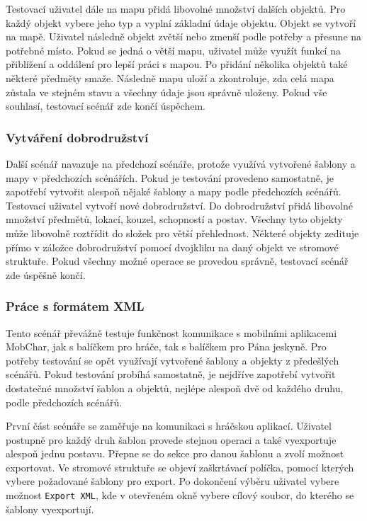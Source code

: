 \documentclass[thesis=B,czech]{resources/FITthesis}[2012/06/26]
\begin{document}
Testovací uživatel dále na mapu přidá libovolné množství dalších objektů. Pro každý objekt vybere jeho typ a vyplní základní údaje objektu. Objekt se vytvoří na mapě. Uživatel následně objekt zvětší nebo zmenší podle potřeby a přesune na potřebné místo. Pokud se jedná o větší mapu, uživatel může využít funkcí na přiblížení a oddálení pro lepší práci s mapou. Po přidání několika objektů také některé předměty smaže. Následně mapu uloží a zkontroluje, zda celá mapa zůstala ve stejném stavu a všechny údaje jsou správně uloženy. Pokud vše souhlasí, testovací scénář zde končí úspěchem. 

\subsubsection{Vytváření dobrodružství}
Další scénář navazuje na předchozí scénáře, protože využívá vytvořené šablony a mapy v předchozích scénářích. Pokud je testování provedeno samostatně, je zapotřebí vytvořit alespoň nějaké šablony a mapy podle předchozích scénářů. Testovací uživatel vytvoří nové dobrodružství. Do dobrodružství přidá libovolné množství předmětů, lokací, kouzel, schopností a postav. Všechny tyto objekty může libovolně roztřídit do složek pro větší přehlednost. Některé objekty zedituje přímo v záložce dobrodružství pomocí dvojkliku na daný objekt ve stromové struktuře. Pokud všechny možné operace se provedou správně, testovací scénář zde úspěšně končí.

\subsubsection{Práce s formátem XML}
Tento scénář převážně testuje funkčnost komunikace s mobilními aplikacemi MobChar, jak s balíčkem pro hráče, tak s balíčkem pro Pána jeskyně. Pro potřeby testování se opět využívají vytvořené šablony a objekty z předešlých scénářů. Pokud testování probíhá samostatně, je nejdříve zapotřebí vytvořit dostatečné množství šablon a objektů, nejlépe alespoň dvě od každého druhu, podle předchozích scénářů. \par

První část scénáře se zaměřuje na komunikaci s hráčskou aplikací. Uživatel postupně pro každý druh šablon provede stejnou operaci a také vyexportuje alespoň jednu postavu. Přepne se do sekce pro danou šablonu a zvolí možnost exportovat. Ve stromové struktuře se objeví zaškrtávací políčka, pomocí kterých vybere požadované šablony pro export. Po dokončení výběru uživatel vybere možnost \texttt{Export XML}, kde v otevřeném okně vybere cílový soubor, do kterého se šablony vyexportují. \par
\end{document}
